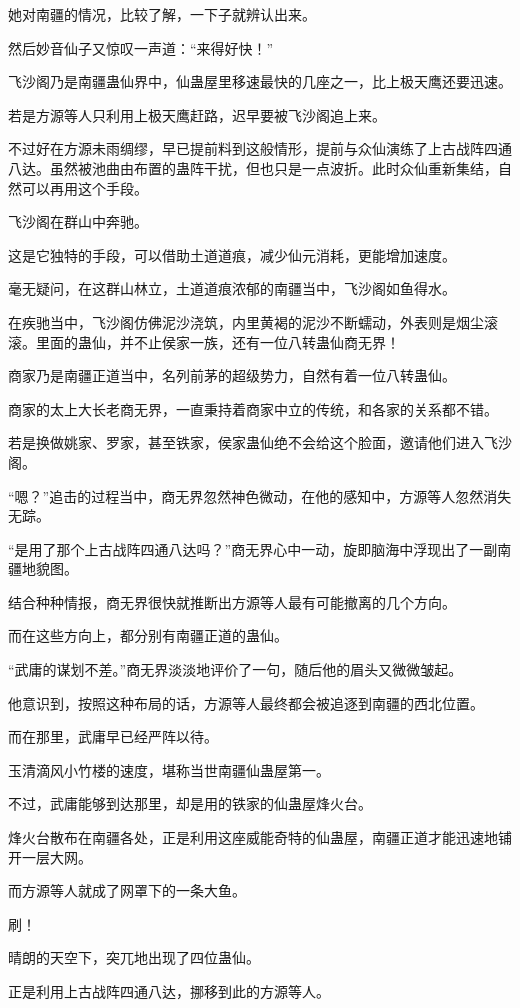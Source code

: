 \begin{this_body}
她对南疆的情况，比较了解，一下子就辨认出来。

然后妙音仙子又惊叹一声道：“来得好快！”

飞沙阁乃是南疆蛊仙界中，仙蛊屋里移速最快的几座之一，比上极天鹰还要迅速。

若是方源等人只利用上极天鹰赶路，迟早要被飞沙阁追上来。

不过好在方源未雨绸缪，早已提前料到这般情形，提前与众仙演练了上古战阵四通八达。虽然被池曲由布置的蛊阵干扰，但也只是一点波折。此时众仙重新集结，自然可以再用这个手段。

飞沙阁在群山中奔驰。

这是它独特的手段，可以借助土道道痕，减少仙元消耗，更能增加速度。

毫无疑问，在这群山林立，土道道痕浓郁的南疆当中，飞沙阁如鱼得水。

在疾驰当中，飞沙阁仿佛泥沙浇筑，内里黄褐的泥沙不断蠕动，外表则是烟尘滚滚。里面的蛊仙，并不止侯家一族，还有一位八转蛊仙商无界！

商家乃是南疆正道当中，名列前茅的超级势力，自然有着一位八转蛊仙。

商家的太上大长老商无界，一直秉持着商家中立的传统，和各家的关系都不错。

若是换做姚家、罗家，甚至铁家，侯家蛊仙绝不会给这个脸面，邀请他们进入飞沙阁。

“嗯？”追击的过程当中，商无界忽然神色微动，在他的感知中，方源等人忽然消失无踪。

“是用了那个上古战阵四通八达吗？”商无界心中一动，旋即脑海中浮现出了一副南疆地貌图。

结合种种情报，商无界很快就推断出方源等人最有可能撤离的几个方向。

而在这些方向上，都分别有南疆正道的蛊仙。

“武庸的谋划不差。”商无界淡淡地评价了一句，随后他的眉头又微微皱起。

他意识到，按照这种布局的话，方源等人最终都会被追逐到南疆的西北位置。

而在那里，武庸早已经严阵以待。

玉清滴风小竹楼的速度，堪称当世南疆仙蛊屋第一。

不过，武庸能够到达那里，却是用的铁家的仙蛊屋烽火台。

烽火台散布在南疆各处，正是利用这座威能奇特的仙蛊屋，南疆正道才能迅速地铺开一层大网。

而方源等人就成了网罩下的一条大鱼。

刷！

晴朗的天空下，突兀地出现了四位蛊仙。

正是利用上古战阵四通八达，挪移到此的方源等人。


\end{this_body}
